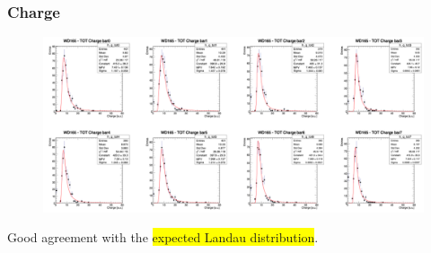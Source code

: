 \begin{frame} [fragile]
    \small
        \frametitle{Charge}
                \begin{figure}
                 \centering
                    \includegraphics[scale=0.28]{figures/charge2.png}
                \end{figure}
            \begin{block}{}
                Good agreement with the \colorbox{yellow}{expected Landau distribution}.
            \end{block}
    \end{frame}
